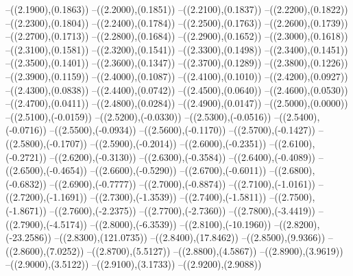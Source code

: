 {	--({\sx*(2.1900)},{\sy*(0.1863)})
	--({\sx*(2.2000)},{\sy*(0.1851)})
	--({\sx*(2.2100)},{\sy*(0.1837)})
	--({\sx*(2.2200)},{\sy*(0.1822)})
	--({\sx*(2.2300)},{\sy*(0.1804)})
	--({\sx*(2.2400)},{\sy*(0.1784)})
	--({\sx*(2.2500)},{\sy*(0.1763)})
	--({\sx*(2.2600)},{\sy*(0.1739)})
	--({\sx*(2.2700)},{\sy*(0.1713)})
	--({\sx*(2.2800)},{\sy*(0.1684)})
	--({\sx*(2.2900)},{\sy*(0.1652)})
	--({\sx*(2.3000)},{\sy*(0.1618)})
	--({\sx*(2.3100)},{\sy*(0.1581)})
	--({\sx*(2.3200)},{\sy*(0.1541)})
	--({\sx*(2.3300)},{\sy*(0.1498)})
	--({\sx*(2.3400)},{\sy*(0.1451)})
	--({\sx*(2.3500)},{\sy*(0.1401)})
	--({\sx*(2.3600)},{\sy*(0.1347)})
	--({\sx*(2.3700)},{\sy*(0.1289)})
	--({\sx*(2.3800)},{\sy*(0.1226)})
	--({\sx*(2.3900)},{\sy*(0.1159)})
	--({\sx*(2.4000)},{\sy*(0.1087)})
	--({\sx*(2.4100)},{\sy*(0.1010)})
	--({\sx*(2.4200)},{\sy*(0.0927)})
	--({\sx*(2.4300)},{\sy*(0.0838)})
	--({\sx*(2.4400)},{\sy*(0.0742)})
	--({\sx*(2.4500)},{\sy*(0.0640)})
	--({\sx*(2.4600)},{\sy*(0.0530)})
	--({\sx*(2.4700)},{\sy*(0.0411)})
	--({\sx*(2.4800)},{\sy*(0.0284)})
	--({\sx*(2.4900)},{\sy*(0.0147)})
	--({\sx*(2.5000)},{\sy*(0.0000)})
	--({\sx*(2.5100)},{\sy*(-0.0159)})
	--({\sx*(2.5200)},{\sy*(-0.0330)})
	--({\sx*(2.5300)},{\sy*(-0.0516)})
	--({\sx*(2.5400)},{\sy*(-0.0716)})
	--({\sx*(2.5500)},{\sy*(-0.0934)})
	--({\sx*(2.5600)},{\sy*(-0.1170)})
	--({\sx*(2.5700)},{\sy*(-0.1427)})
	--({\sx*(2.5800)},{\sy*(-0.1707)})
	--({\sx*(2.5900)},{\sy*(-0.2014)})
	--({\sx*(2.6000)},{\sy*(-0.2351)})
	--({\sx*(2.6100)},{\sy*(-0.2721)})
	--({\sx*(2.6200)},{\sy*(-0.3130)})
	--({\sx*(2.6300)},{\sy*(-0.3584)})
	--({\sx*(2.6400)},{\sy*(-0.4089)})
	--({\sx*(2.6500)},{\sy*(-0.4654)})
	--({\sx*(2.6600)},{\sy*(-0.5290)})
	--({\sx*(2.6700)},{\sy*(-0.6011)})
	--({\sx*(2.6800)},{\sy*(-0.6832)})
	--({\sx*(2.6900)},{\sy*(-0.7777)})
	--({\sx*(2.7000)},{\sy*(-0.8874)})
	--({\sx*(2.7100)},{\sy*(-1.0161)})
	--({\sx*(2.7200)},{\sy*(-1.1691)})
	--({\sx*(2.7300)},{\sy*(-1.3539)})
	--({\sx*(2.7400)},{\sy*(-1.5811)})
	--({\sx*(2.7500)},{\sy*(-1.8671)})
	--({\sx*(2.7600)},{\sy*(-2.2375)})
	--({\sx*(2.7700)},{\sy*(-2.7360)})
	--({\sx*(2.7800)},{\sy*(-3.4419)})
	--({\sx*(2.7900)},{\sy*(-4.5174)})
	--({\sx*(2.8000)},{\sy*(-6.3539)})
	--({\sx*(2.8100)},{\sy*(-10.1960)})
	--({\sx*(2.8200)},{\sy*(-23.2586)})
	--({\sx*(2.8300)},{\sy*(121.0735)})
	--({\sx*(2.8400)},{\sy*(17.8462)})
	--({\sx*(2.8500)},{\sy*(9.9366)})
	--({\sx*(2.8600)},{\sy*(7.0252)})
	--({\sx*(2.8700)},{\sy*(5.5127)})
	--({\sx*(2.8800)},{\sy*(4.5867)})
	--({\sx*(2.8900)},{\sy*(3.9619)})
	--({\sx*(2.9000)},{\sy*(3.5122)})
	--({\sx*(2.9100)},{\sy*(3.1733)})
	--({\sx*(2.9200)},{\sy*(2.9088)})
}
